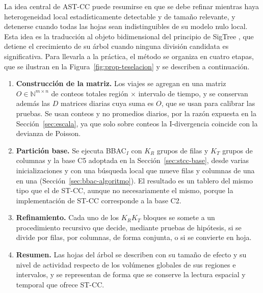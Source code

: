La idea central de AST-CC puede resumirse en que se debe refinar mientras haya
heterogeneidad local estadísticamente detectable y de tamaño relevante, y
detenerse cuando todas las hojas sean indistinguibles de su modelo nulo local.
Esta idea es la traducción al objeto bidimensional del principio de SigTree
\cite{Hu2025}, que detiene el crecimiento de su árbol cuando ninguna división
candidata es significativa. Para llevarla a la práctica, el método se organiza en
cuatro etapas, que se ilustran en la Figura~\ref{fig:prop-teselacion} y se
describen a continuación.

\begin{enumerate}
  \item \textbf{Construcción de la matriz.} Los viajes se agregan en una
  matriz $O \in \mathbb{N}^{m\times n}$ de conteos totales región $\times$
  intervalo de tiempo, y se conservan además las $D$ matrices diarias cuya
  suma es $O$, que se usan para calibrar las pruebas. Se usan conteos y no
  promedios diarios, por la razón expuesta en la Sección~\ref{sec:escala}, ya que
  solo sobre conteos la I-divergencia coincide con la devianza de Poisson.
  \item \textbf{Partición base.} Se ejecuta BBAC$_I$ con $K_R$ grupos de
  filas y $K_T$ grupos de columnas y la base C5 adoptada en la
  Sección~\ref{sec:stcc-base}, desde varias inicializaciones y con una
  búsqueda local que mueve filas y columnas de una en una
  (Sección~\ref{sec:bbac-algoritmo}). El resultado es un tablero del mismo tipo
  que el de ST-CC, aunque no necesariamente el mismo, porque la implementación
  de ST-CC corresponde a la base C2.
  \item \textbf{Refinamiento.} Cada uno de los $K_R K_T$ bloques se somete a
  un procedimiento recursivo que decide, mediante pruebas de hipótesis, si se
  divide por filas, por columnas, de forma conjunta, o si se convierte en hoja.
  \item \textbf{Resumen.} Las hojas del árbol se describen con su tamaño de
  efecto y su nivel de actividad respecto de los volúmenes globales de sus
  regiones e intervalos, y se representan de forma que se conserve la lectura
  espacial y temporal que ofrece ST-CC.
\end{enumerate}

